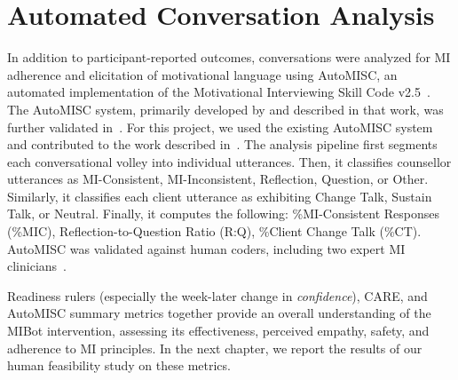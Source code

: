 \section{Automated Conversation Analysis}
\label{subsec:automisc}
In addition to participant-reported outcomes, conversations were analyzed for MI adherence and elicitation of motivational language using AutoMISC, an automated implementation of the Motivational Interviewing Skill Code v2.5~\citep{Houck2010}. The AutoMISC system, primarily developed by \citet{ali2025thesis} and described in that work, was further validated in~\citep{ali2025automated}. For this project, we used the existing AutoMISC system and contributed to the work described in~\citep{mahmood-etal-2025-fully}. The analysis pipeline first segments each conversational volley into individual utterances. Then, it classifies counsellor utterances as MI-Consistent, MI-Inconsistent, Reflection, Question, or Other. Similarly, it classifies each client utterance as exhibiting Change Talk, Sustain Talk, or Neutral. Finally, it computes the following: \%MI-Consistent Responses (\%MIC), Reflection-to-Question Ratio (R:Q), \%Client Change Talk (\%CT). AutoMISC was validated against human coders, including two expert MI clinicians~\citep{mahmood-etal-2025-fully}.

Readiness rulers (especially the week-later change in \emph{confidence}), CARE, and AutoMISC summary metrics together provide an overall understanding of the MIBot intervention, assessing its effectiveness, perceived empathy, safety, and adherence to MI principles. In the next chapter, we report the results of our human feasibility study on these metrics.
